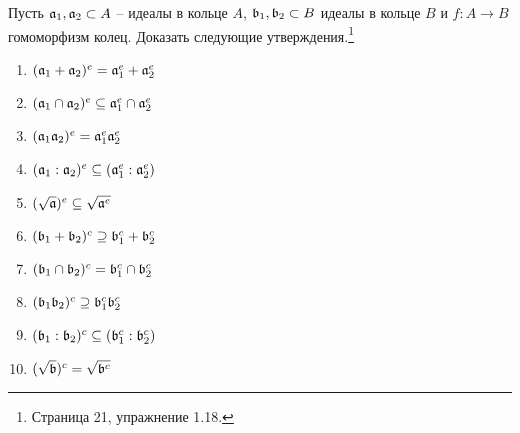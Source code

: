     \begin{Ex} 
        Пусть $\mathfrak{a}_1, \mathfrak{a}_2 \subset A$ -- идеалы в кольце $A$, $\mathfrak{b}_1, \mathfrak{b}_2 \subset B$ идеалы в кольце $B$ и 
        $f : A \rightarrow B$ гомоморфизм колец. Доказать следующие утверждения.\footnote{\cite{A-M} Страница 21, упражнение 1.18.}
        
        \begin{enumerate}
            \item $(\mathfrak{a}_1 + \mathfrak{a}_2)^e = \mathfrak{a}_1^e + \mathfrak{a}_2^e$
            \item $(\mathfrak{a}_1 \cap \mathfrak{a}_2)^e \subseteq \mathfrak{a}_1^e \cap \mathfrak{a}_2^e$
            \item $(\mathfrak{a}_1\mathfrak{a}_2)^e = \mathfrak{a}_1^e\mathfrak{a}_2^e$
            \item $(\mathfrak{a}_1 : \mathfrak{a}_2)^e \subseteq (\mathfrak{a}_1^e : \mathfrak{a}_2^e)$
            \item $(\sqrt{\mathfrak{a}})^e \subseteq \sqrt{\mathfrak{a}^e}$
            \item $(\mathfrak{b}_1 + \mathfrak{b}_2)^c \supseteq \mathfrak{b}_1^c + \mathfrak{b}_2^c$
            \item $(\mathfrak{b}_1 \cap \mathfrak{b}_2)^c = \mathfrak{b}_1^c \cap \mathfrak{b}_2^c$
            \item $(\mathfrak{b}_1\mathfrak{b}_2)^c \supseteq \mathfrak{b}_1^c\mathfrak{b}_2^c$
            \item $(\mathfrak{b}_1 : \mathfrak{b}_2)^c \subseteq (\mathfrak{b}_1^c : \mathfrak{b}_2^c)$
            \item $(\sqrt{\mathfrak{b}})^c = \sqrt{\mathfrak{b}^c}$
        \end{enumerate}
    \end{Ex}

